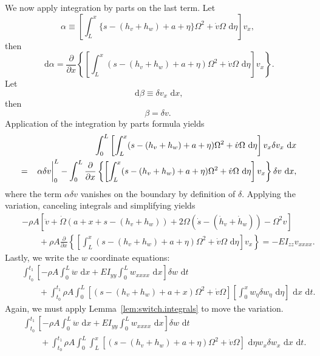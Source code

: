 We now apply integration by parts on the last term. Let 
\begin{equation}
\alpha \equiv \left[\int_L^x\lbrace s-(h_v+h_w)+a+\eta\rbrace\Omega^2+\dot v\Omega\text{ d}\eta\right] v_{x},
\end{equation}
then
\begin{equation}
\text{ d}\alpha = \frac{\partial }{\partial x}\left\lbrace\left[\int_L^x( s-(h_v+h_w)+a+\eta)\Omega^2+\dot v\Omega\text{ d}\eta\right] v_{x}\right\rbrace.
\end{equation}
Let 
\begin{equation}
\text{ d}\beta \equiv \delta v_x\text{ d}x,
\end{equation}
then
\begin{equation}
\beta = \delta v.
\end{equation}
Application of the integration by parts formula yields
\begin{eqnarray}
& &\int_0^L \left[\int_L^x(s-(h_v+h_w)+a+\eta)\Omega^2+\dot v\Omega\text{ d}\eta\right] v_{x}\delta v_x\text{ d}x \\
&=& \left.\vphantom{\frac{0}{0}}\alpha\delta v\right|_0^L-\int_0^L\frac{\partial }{\partial x}\left\lbrace\left[\int_L^x( s-(h_v+h_w)+a+\eta)\Omega^2+\dot v\Omega\text{ d}\eta\right] v_{x}\right\rbrace\delta v\text{ d}x,\nonumber
\end{eqnarray}
where the term $\alpha\delta v$ vanishes on the boundary by definition of $\delta$.
Applying the variation, canceling integrals and simplifying yields
\begin{eqnarray}
\label{eq:v.full.nonlinear}
& & -\rho A [\ddot v + \dot \Omega (a+x+s-(h_v+h_w))+2\Omega(\dot s - (\dot h_v+\dot h_w))-\Omega^2v] \\ 
& & \qquad +\rho A \frac{\partial }{\partial x}\left\lbrace\left[\int_L^x( s-(h_v+h_w)+a+\eta)\Omega^2+\dot v\Omega\text{ d}\eta\right] v_{x}\right\rbrace = -EI_{zz}v_{xxxx}.\nonumber
\end{eqnarray}
Lastly, we write the $w$ coordinate equations:
\begin{eqnarray}
& & \int_{t_0}^{t_1}\left[-\rho A\int_0^L \ddot w\text{ d}x+EI_{yy}\int_0^L w_{xxxx}\text{ d}x\right]\delta w\text{ d}t \\
& & \qquad +\int_{t_0}^{t_1}\rho A\int_0^L  [( s-(h_v+h_w)+a+x)\Omega^2+\dot v\Omega]\left[\int_0^xw_{\eta}\delta w_{\eta}\text{ d}\eta\right]\text{ d}x\text{ d}t.\nonumber 
\end{eqnarray}
Again, we must apply Lemma~\ref{lem:switch.integrals} to move the variation.
\begin{eqnarray}
& & \int_{t_0}^{t_1}\left[-\rho A\int_0^L \ddot w\text{ d}x+EI_{yy}\int_0^L w_{xxxx}\text{ d}x\right]\delta w\text{ d}t \\
& & \qquad +\int_{t_0}^{t_1}\rho A\int_0^L \int_L^x[(s-(h_v+h_w)+a+\eta)\Omega^2+\dot v\Omega]\text{ d}\eta w_{x}\delta w_x\text{ d}x\text{ d}t.\nonumber 
\end{eqnarray}
